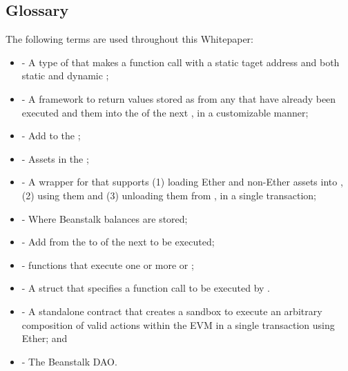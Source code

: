 \documentclass[class=article, crop=false]{standalone}
\begin{document}
\subsection{Glossary}
The following terms are used throughout this Whitepaper:
\begin{itemize}[topsep=0pt, itemsep=3pt,leftmargin=16pt]
    \item[]  - A type of  that makes a function call with a  static taget address and both static and dynamic ;
    \item[]  - A framework to  return values stored as  from any  that have already been executed and  them into the  of the next , in a customizable manner;
    \item[]  - Add  to the ;
    \item[]  - Assets in the ;
    \item[]  - A wrapper for  that supports (1) loading Ether and non-Ether assets into , (2) using them and (3) unloading them from , in a single transaction;
    \item[]  - Where Beanstalk  balances are stored; 
    \item[]  - Add  from the  to  of the next  to be executed;
    \item[]  -  functions that execute one or more  or ;
    \item[]  - A struct that specifies a function call to be executed by . 
    \item[]  - A standalone contract that creates a sandbox to execute an arbitrary composition of valid actions within the EVM in a single transaction using Ether; and
    \item[]  - The Beanstalk DAO.
\end{itemize}
\end{document}
